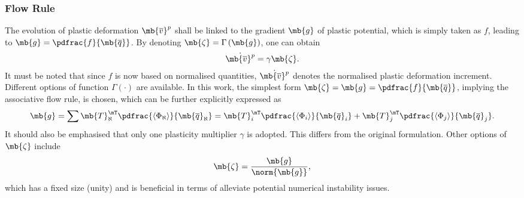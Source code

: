 \subsubsection{Flow Rule}
The evolution of plastic deformation $\mb{\overline{v}}^p$ shall be linked to the gradient $\mb{g}$ of plastic potential, which is simply taken as $f$, leading to $\mb{g}=\pdfrac{f}{\mb{\overline{q}}}$. By denoting $\mb{\zeta}=\Gamma\left(\mb{g}\right)$, one can obtain
\begin{gather}\label{eq:nm_flow}
\dot{\mb{\overline{v}}^p}=\gamma\mb{\zeta}.
\end{gather}
It must be noted that since $f$ is now based on normalised quantities, $\dot{\mb{\overline{v}}^p}$ denotes the normalised plastic deformation increment. Different options of function $\Gamma\left(\cdot\right)$ are available. In this work, the simplest form $\mb{\zeta}=\mb{g}=\pdfrac{f}{\mb{\overline{q}}}$, implying the associative flow rule, is chosen, which can be further explicitly expressed as
\begin{gather}\label{eq:nm_flow_a}
\mb{g}=\sum\mb{T}_\aleph^\mT\pdfrac{\langle\Phi_\aleph\rangle}{\mb{\overline{q}}_\aleph}=\mb{T}_i^\mT\pdfrac{\langle\Phi_i\rangle}{\mb{\overline{q}}_i}+\mb{T}_j^\mT\pdfrac{\langle\Phi_j\rangle}{\mb{\overline{q}}_j}.
\end{gather}
It should also be emphasised that only one plasticity multiplier $\gamma$ is adopted. This differs from the original formulation. Other options of $\mb{\zeta}$ include
\begin{gather}
\mb{\zeta}=\dfrac{\mb{g}}{\norm{\mb{g}}},
\end{gather}
which has a fixed size (unity) and is beneficial in terms of alleviate potential numerical instability issues.
